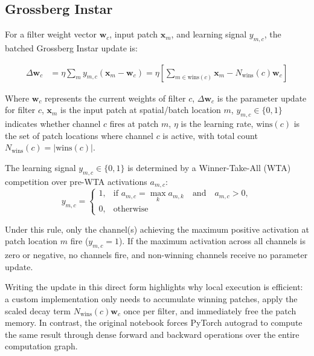 \documentclass{article}
\begin{document}
    \subsection{Grossberg Instar} 
    
    For a filter weight vector $\mathbf{w}_c$, input patch $\mathbf{x}_m$, and learning signal $y_{m,c}$, the batched Grossberg Instar update is:

\begin{align}
\Delta \mathbf{w}_c &= \eta \sum_m y_{m,c} (\mathbf{x}_m - \mathbf{w}_c) = \eta \left[ \sum_{m \in \text{wins}(c)} \mathbf{x}_m - N_{\text{wins}}(c)\mathbf{w}_c \right]
\label{eq:instar_expanded}
\end{align}

Where $\mathbf{w}_c$ represents the current weights of filter $c$, $\Delta\mathbf{w}_c$ is the parameter update for filter $c$, $\mathbf{x}_m$ is the input patch at spatial/batch location $m$, $y_{m,c} \in \{0, 1\}$ indicates whether channel $c$ fires at patch $m$, $\eta$ is the learning rate, $\text{wins}(c)$ is the set of patch locations where channel $c$ is active, with total count $N_{\text{wins}}(c) = \vert{}\text{wins}(c)\vert{}$.

The learning signal $y_{m,c} \in \{0, 1\}$ is determined by a Winner-Take-All (WTA) competition over pre-WTA activations $a_{m,c}$:
\begin{equation}
    y_{m,c} = 
    \begin{cases} 
    1, & \text{if } a_{m,c} = \max_{k} a_{m,k} \quad \text{and} \quad a_{m,c} > 0, \\ 
    0, & \text{otherwise} 
    \end{cases}
\label{eq:wta}
\end{equation}

Under this rule, only the channel(s) achieving the maximum positive activation at patch location $m$ fire ($y_{m,c} = 1$). If the maximum activation across all channels is zero or negative, no channels fire, and non-winning channels receive no parameter update.

Writing the update in this direct form highlights why local execution is efficient: a custom implementation only needs to accumulate winning patches, apply the scaled decay term $N_{\text{wins}}(c)\mathbf{w}_c$ once per filter, and immediately free the patch memory. In contrast, the original notebook forces PyTorch autograd to compute the same result through dense forward and backward operations over the entire computation graph.
\end{document}
